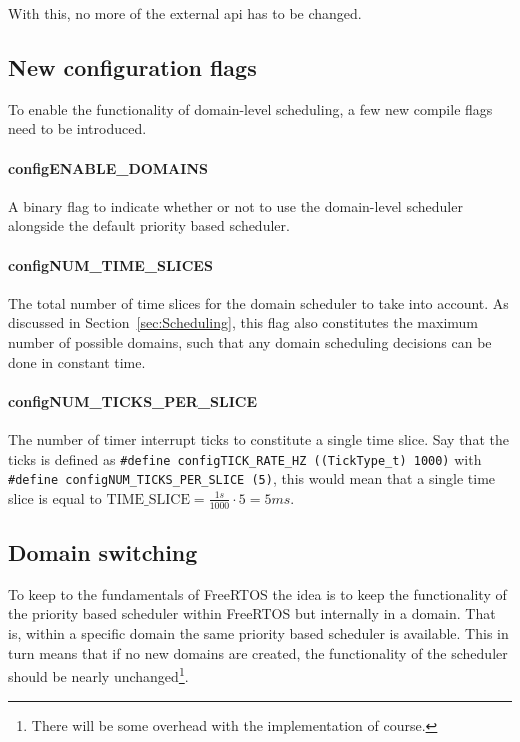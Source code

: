 With this, no more of the external api has to be changed.

\subsection{New configuration flags}\label{sub:config-flags}
To enable the functionality of domain-level scheduling, a few new compile flags
need to be introduced.

\paragraph{configENABLE\_DOMAINS} A binary flag to indicate whether or not to
use the domain-level scheduler alongside the default priority based scheduler.

\paragraph{configNUM\_TIME\_SLICES} The total number of time slices for the
domain scheduler to take into account. As discussed in
Section~\ref{sec:Scheduling}, this flag also constitutes the maximum number of
possible domains, such that any domain scheduling decisions can be done in
constant time.

\paragraph{configNUM\_TICKS\_PER\_SLICE} The number of timer interrupt ticks to
constitute a single time slice. Say that the ticks is defined as
\texttt{\#define configTICK\_RATE\_HZ ((TickType\_t) 1000)} with \texttt{\#define
configNUM\_TICKS\_PER\_SLICE (5)}, this would mean that a single time slice is
equal to $\text{TIME\_SLICE} = \frac{1s}{1000} \cdot 5 = 5ms$.

\subsection{Domain switching}\label{sub:domain-switch}

To keep to the fundamentals of FreeRTOS the idea is to keep the functionality
of the priority based scheduler within FreeRTOS but internally in a domain.
That is, within a specific domain the same priority based scheduler is
available. This in turn means that if no new domains are created, the
functionality of the scheduler should be nearly unchanged\footnote{There will
be some overhead with the implementation of course.}.

